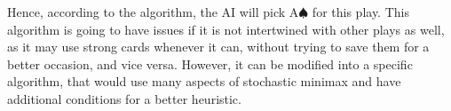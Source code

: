 Hence, according to the algorithm, the AI will pick A$\spadesuit$ for this play. This algorithm is going to
have issues if it is not intertwined with other plays as well, as it may use strong cards whenever it can, without trying to
save them for a better occasion, and vice versa. However, it can be modified into a specific algorithm, that would
use many aspects of stochastic minimax and have additional conditions for a better heuristic.